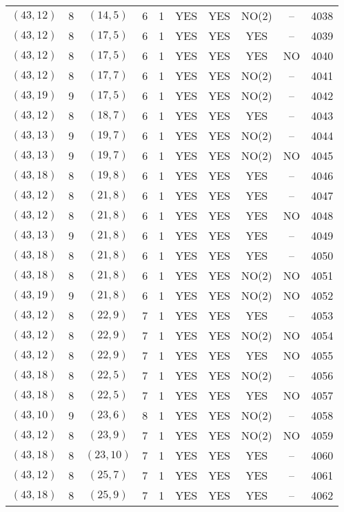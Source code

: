 \begin{longtable}{|c|c|c|c|c|c|c|c|c|c|}
$(43, 12)$ & 8 & $(14, 5)$ & 6 & 1 & YES & YES & NO(2) & -- & 4038\\
$(43, 12)$ & 8 & $(17, 5)$ & 6 & 1 & YES & YES & YES & -- & 4039\\
$(43, 12)$ & 8 & $(17, 5)$ & 6 & 1 & YES & YES & YES & NO & 4040\\
$(43, 12)$ & 8 & $(17, 7)$ & 6 & 1 & YES & YES & NO(2) & -- & 4041\\
$(43, 19)$ & 9 & $(17, 5)$ & 6 & 1 & YES & YES & NO(2) & -- & 4042\\
$(43, 12)$ & 8 & $(18, 7)$ & 6 & 1 & YES & YES & YES & -- & 4043\\
$(43, 13)$ & 9 & $(19, 7)$ & 6 & 1 & YES & YES & NO(2) & -- & 4044\\
$(43, 13)$ & 9 & $(19, 7)$ & 6 & 1 & YES & YES & NO(2) & NO & 4045\\
$(43, 18)$ & 8 & $(19, 8)$ & 6 & 1 & YES & YES & YES & -- & 4046\\
$(43, 12)$ & 8 & $(21, 8)$ & 6 & 1 & YES & YES & YES & -- & 4047\\
$(43, 12)$ & 8 & $(21, 8)$ & 6 & 1 & YES & YES & YES & NO & 4048\\
$(43, 13)$ & 9 & $(21, 8)$ & 6 & 1 & YES & YES & YES & -- & 4049\\
$(43, 18)$ & 8 & $(21, 8)$ & 6 & 1 & YES & YES & YES & -- & 4050\\
$(43, 18)$ & 8 & $(21, 8)$ & 6 & 1 & YES & YES & NO(2) & NO & 4051\\
$(43, 19)$ & 9 & $(21, 8)$ & 6 & 1 & YES & YES & NO(2) & NO & 4052\\
$(43, 12)$ & 8 & $(22, 9)$ & 7 & 1 & YES & YES & YES & -- & 4053\\
$(43, 12)$ & 8 & $(22, 9)$ & 7 & 1 & YES & YES & NO(2) & NO & 4054\\
$(43, 12)$ & 8 & $(22, 9)$ & 7 & 1 & YES & YES & YES & NO & 4055\\
$(43, 18)$ & 8 & $(22, 5)$ & 7 & 1 & YES & YES & NO(2) & -- & 4056\\
$(43, 18)$ & 8 & $(22, 5)$ & 7 & 1 & YES & YES & YES & NO & 4057\\
$(43, 10)$ & 9 & $(23, 6)$ & 8 & 1 & YES & YES & NO(2) & -- & 4058\\
$(43, 12)$ & 8 & $(23, 9)$ & 7 & 1 & YES & YES & NO(2) & NO & 4059\\
$(43, 18)$ & 8 & $(23, 10)$ & 7 & 1 & YES & YES & YES & -- & 4060\\
$(43, 12)$ & 8 & $(25, 7)$ & 7 & 1 & YES & YES & YES & -- & 4061\\
$(43, 18)$ & 8 & $(25, 9)$ & 7 & 1 & YES & YES & YES & -- & 4062\\

\end{longtable}
